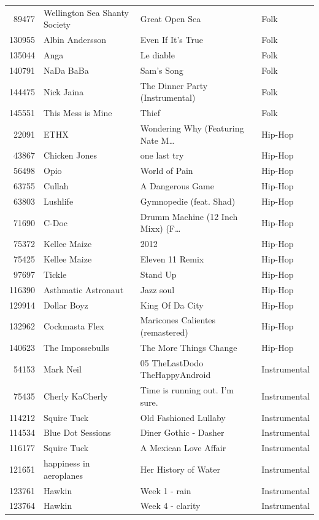\begin{footnotesize}
\begin{longtable}{@{}rlll@{}}
89477 & Wellington Sea Shanty Society & Great Open Sea & Folk \\
130955 & Albin Andersson & Even If It's True & Folk \\
135044 & Anga & Le diable & Folk \\
140791 & NaDa BaBa & Sam's Song & Folk \\
144475 & Nick Jaina & The Dinner Party (Instrumental) & Folk \\
145551 & This Mess is Mine & Thief & Folk \\
22091 & ETHX & Wondering Why (Featuring Nate M\ldots & Hip-Hop \\
43867 & Chicken Jones & one last try & Hip-Hop \\
56498 & Opio & World of Pain & Hip-Hop \\
63755 & Cullah & A Dangerous Game & Hip-Hop \\
63803 & Lushlife & Gymnopedie (feat. Shad) & Hip-Hop \\
71690 & C-Doc & Drumm Machine (12 Inch Mixx) (F\ldots & Hip-Hop \\
75372 & Kellee Maize & 2012 & Hip-Hop \\
75425 & Kellee Maize & Eleven 11 Remix & Hip-Hop \\
97697 & Tickle & Stand Up & Hip-Hop \\
116390 & Asthmatic Astronaut & Jazz soul & Hip-Hop \\
129914 & Dollar Boyz & King Of Da City & Hip-Hop \\
132962 & Cockmasta Flex & Maricones Calientes (remastered) & Hip-Hop \\
140623 & The Impossebulls & The More Things Change & Hip-Hop \\
54153 & Mark Neil & 05 TheLastDodo TheHappyAndroid & Instrumental \\
75435 & Cherly KaCherly & Time is running out. I'm sure. & Instrumental \\
114212 & Squire Tuck & Old Fashioned Lullaby & Instrumental \\
114534 & Blue Dot Sessions & Diner Gothic - Dasher & Instrumental \\
116177 & Squire Tuck & A Mexican Love Affair & Instrumental \\
121651 & happiness in aeroplanes & Her History of Water & Instrumental \\
123761 & Hawkin & Week 1 - rain & Instrumental \\
123764 & Hawkin & Week 4 - clarity & Instrumental \\

\end{longtable}
\end{footnotesize}
